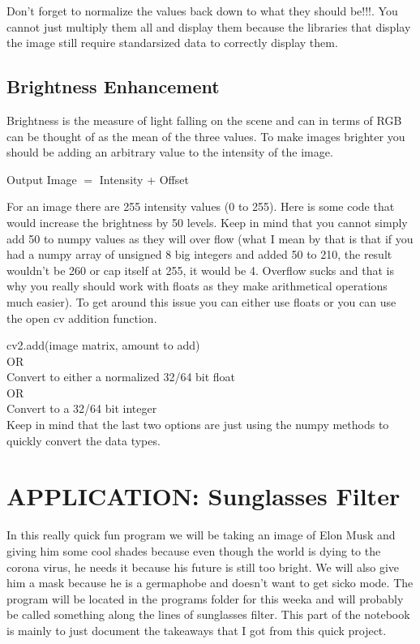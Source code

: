 \documentclass[fleqn]{article}
\begin{document}
    Don't forget to normalize the values back down to what they should be!!!. You cannot just multiply them all and display them because the libraries that display the image still require standarsized data to correctly display them.

    \newpage

    \subsection{Brightness Enhancement}
    Brightness is the measure of light falling on the scene and can in terms of RGB can be thought of as the mean of the three values. To make images brighter you should be adding an arbitrary value to the intensity of the image.
    \begin{center}
      Output Image $=$ Intensity + Offset
    \end{center}
    For an image there are 255 intensity values (0 to 255). Here is some code that would increase the brightness by 50 levels. Keep in mind that you cannot simply add 50 to numpy values as they will over flow (what I mean by that is that if you had a numpy array of unsigned 8 big integers and added 50 to 210, the result wouldn't be 260 or cap itself at 255, it would be 4. Overflow sucks and that is why you really should work with floats as they make arithmetical operations much easier). To get around this issue you can either use floats or you can use the open cv addition function.
    \begin{center}
      cv2.add(image matrix, amount to add)\\
      OR\\
      Convert to either a normalized 32/64 bit float\\
      OR\\
      Convert to a 32/64 bit integer\\
      Keep in mind that the last two options are just using the numpy methods to quickly convert the data types.
    \end{center}

    \section{APPLICATION: Sunglasses Filter}
      In this really quick fun program we will be taking an image of Elon Musk and giving him some cool shades because even though the world is dying to the corona virus, he needs it because his future is still too bright. We will also give him a mask because he is a germaphobe and doesn't want to get sicko mode. The program will be located in the programs folder for this weeka and will probably be called something along the lines of sunglasses filter. This part of the notebook is mainly to just document the takeaways that I got from this quick project.\\
\end{document}
